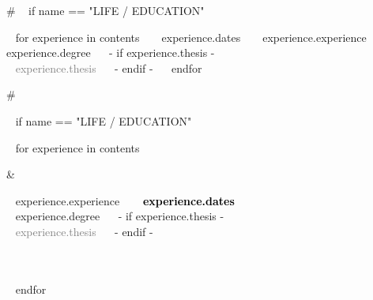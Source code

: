 

\medskip

\selectfont


\begin{minipage}{\textwidth}


{#
~{ if name == "LIFE / EDUCATION" }~
  \begin{entrylist}
  ~{ for experience in contents }~
      \eduentry
        {~{{ experience.dates }}~} %
        {~{{ experience.experience }}~} %
        {} %
        {~{{ experience.degree }}~ 
        ~{- if experience.thesis -}~ \\ \textcolor{gray}{~{{ experience.thesis }}~} ~{- endif -}~
        } %
  ~{ endfor }~
  \end{entrylist}
#}

~{ if name == "LIFE / EDUCATION" }~
\begin{entrylist}
 ~{ for experience in contents }~
\parbox[t]{0.1\textwidth}{%
    \hfill %
  }%
  &\parbox[t]{0.8\textwidth}{%
    ~{{ experience.experience }}~%
    \hfill%
    {\small\textbf{\textcolor{black}{~{{ experience.dates }}~}}}\\%
    ~{{ experience.degree }}~ ~{- if experience.thesis -}~ \\ \textcolor{gray}{~{{ experience.thesis }}~} ~{- endif -}~
  }\\\\
  ~{ endfor }~
\end{entrylist}



\end{minipage}
